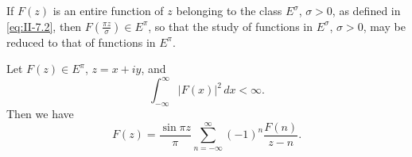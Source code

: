 If $F(z)$ is an entire function of $z$ belonging to the class $E^{\sigma}$, $\sigma>0$, as defined in \eqref{eq:II-7.2}, then $F(\frac{\pi z}{\sigma})\in E^{\pi}$, so that the study of functions in $E^{\sigma}$, $\sigma>0$, may be reduced to that of functions in $E^{\pi}$.

\begin{theorem}[Hardy]\label{thm:II-11}
Let $F(z)\in E^{\pi}$, $z=x+iy$, and
\begin{equation}\tag{9.1}\label{eq:II-9.1}
\int_{-\infty}^{\infty}|F(x)|^{2}\,dx<\infty.
\end{equation}
Then we have
\begin{equation}\tag{9.2}\label{eq:II-9.2}
F(z)=\frac{\sin\pi z}{\pi}\sum_{n=-\infty}^{\infty}(-1)^{n}\frac{F(n)}{z-n}.
\end{equation}
\end{theorem}
